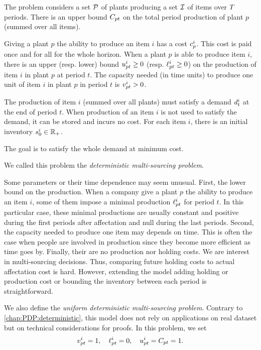 \medskip


The problem considers a set $\mathcal{P}$ of plants producing a set $\mathcal{I}$ of items over $T$ periods.
There is an upper bound $C_{pt}$ on the total period production of plant $p$ (summed over all items).

Giving a plant $p$ the ability to produce an item $i$ has a cost $c_p^i$.
This cost is paid once and for all for the whole horizon.
When a plant $p$ is able to produce item $i$, there is an upper (resp. lower) bound $u_{pt}^i\ge 0$ (resp. $\ell_{pt}^i\ge 0$) on the production of item $i$ in plant $p$ at period $t$.
The capacity needed (in time units) to produce one unit of item $i$ in plant $p$ in period $t$ is $v_{pt}^i>0$.


The production of item $i$ (summed over all plants) must satisfy a demand $d_t^i$ at the end of period $t$.
When production of an item $i$ is not used to satisfy the demand, it can be stored and incurs no cost.
For each item $i$, there is an initial inventory $s_0^i\in\mathbb{R}_+$.


The goal is to satisfy the whole demand at minimum cost.


We called this problem the \emph{deterministic multi-sourcing problem}.


\medskip


Some parameters or their time dependence may seem unusual.
First, the lower bound on the production.
When a company give a plant $p$ the ability to produce an item $i$, some of them impose a minimal production $\ell_{pt}^i$ for period $t$.
In this particular case, these minimal productions are usually constant and positive during the first periods after affectation and null during the last periods.
Second, the capacity needed to produce one item may depends on time.
This is often the case when people are involved in production since they become more efficient as time goes by.
Finally, their are no production nor holding costs.
We are interest in multi-sourcing decisions.
Thus, comparing future holding costs to actual affectation cost is hard.
However, extending the model adding holding or production cost or bounding the inventory between each period is straightforward.


\medskip


We also define the \emph{uniform deterministic multi-sourcing problem}. Contrary to \cref{chap:PDP:deterministic}, this model does not rely on applications on real dataset but on technical considerations for proofs. In this problem, we set
$$
v_{pt}^i = 1
,\quad
\ell_{pt}^i = 0
,\quad
u_{pt}^i = C_{pt} = 1
.
$$



